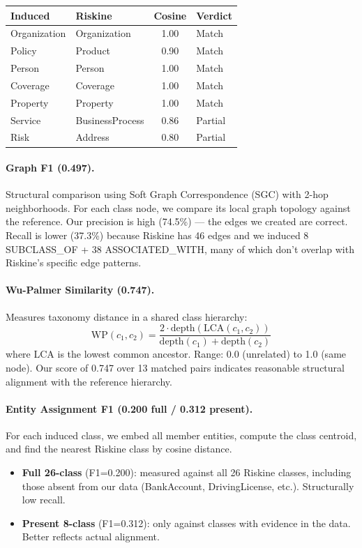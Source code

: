\documentclass[11pt]{article}
\begin{document}
\begin{table}[h]
\centering
\begin{tabular}{llcl}
\toprule
\textbf{Induced} & \textbf{Riskine} & \textbf{Cosine} & \textbf{Verdict} \\
\midrule
Organization & Organization & 1.00 & Match \\
Policy & Product & 0.90 & Match \\
Person & Person & 1.00 & Match \\
Coverage & Coverage & 1.00 & Match \\
Property & Property & 1.00 & Match \\
Service & BusinessProcess & 0.86 & Partial \\
Risk & Address & 0.80 & Partial \\
\bottomrule
\end{tabular}
\end{table}

\paragraph{Graph F1 (0.497).}
Structural comparison using Soft Graph Correspondence (SGC) with 2-hop neighborhoods. For each class node, we compare its local graph topology against the reference. Our precision is high (74.5\%) --- the edges we created are correct. Recall is lower (37.3\%) because Riskine has 46 edges and we induced 8 SUBCLASS\_OF + 38 ASSOCIATED\_WITH, many of which don't overlap with Riskine's specific edge patterns.

\paragraph{Wu-Palmer Similarity (0.747).}
Measures taxonomy distance in a shared class hierarchy:
\[
\text{WP}(c_1, c_2) = \frac{2 \cdot \text{depth}(\text{LCA}(c_1, c_2))}{\text{depth}(c_1) + \text{depth}(c_2)}
\]
where LCA is the lowest common ancestor. Range: 0.0 (unrelated) to 1.0 (same node). Our score of 0.747 over 13 matched pairs indicates reasonable structural alignment with the reference hierarchy.

\paragraph{Entity Assignment F1 (0.200 full / 0.312 present).}
For each induced class, we embed all member entities, compute the class centroid, and find the nearest Riskine class by cosine distance.
\begin{itemize}[nosep]
    \item \textbf{Full 26-class} (F1=0.200): measured against all 26 Riskine classes, including those absent from our data (BankAccount, DrivingLicense, etc.). Structurally low recall.
    \item \textbf{Present 8-class} (F1=0.312): only against classes with evidence in the data. Better reflects actual alignment.
\end{itemize}
\end{document}
